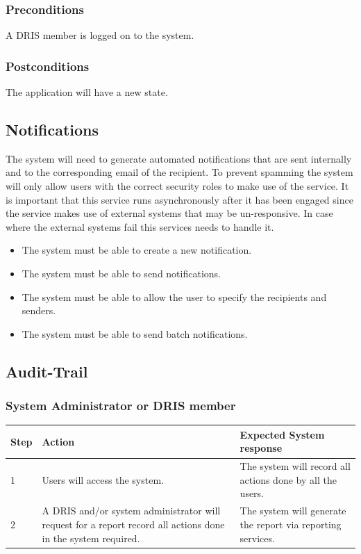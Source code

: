 \documentclass[12pt]{article}
\begin{document}
\subsubsection*{Preconditions}
A DRIS member is logged on to the system.

\subsubsection*{Postconditions}
The application will have a new state.


\subsection{Notifications}
The system will need to generate automated notifications that are sent internally and to
the corresponding email of the recipient. To prevent spamming the system will only allow
users with the correct security roles to make use of the service. It is important that this
service runs asynchronously after it has been engaged since the service makes use of external
systems that may be un-responsive. In case where the external systems fail this services
needs to handle it.
\begin{itemize}
\item
The system must be able to create a new notification.
\item
The system must be able to send notifications.
\item
The system must be able to allow the user to specify the recipients and senders.
\item
The system must be able to send batch notifications.
\end{itemize}

\subsection{Audit-Trail}
\subsubsection{System Administrator or DRIS member}
\begin{center}
\begin{tabular}{|l|p{6cm}|p{8cm}|}
\hline
Step & Action & Expected System response \\
\hline
1 & Users will access the system. & The system will record all actions done by all the users. \\
\hline


2 & A DRIS and/or system administrator will request for a report record all actions done in the system required. & The system will generate the report via reporting services. \\
\hline
\end{tabular}
\end{center}
\end{document}
